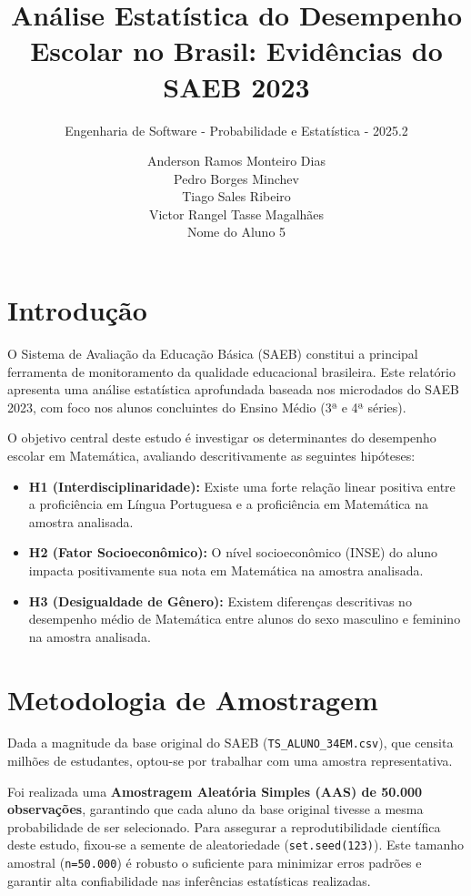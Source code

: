 \documentclass[
]{article}
\title{\textbf{Análise Estatística do Desempenho Escolar no Brasil:
Evidências do SAEB 2023}}
\subtitle{Engenharia de Software - Probabilidade e Estatística - 2025.2}
\author{Anderson Ramos Monteiro Dias\\
Pedro Borges Minchev\\
Tiago Sales Ribeiro\\
Victor Rangel Tasse Magalhães\\
Nome do Aluno 5}
\date{}
\begin{document}
\maketitle

\section{Introdução}\label{introduuxe7uxe3o}

O Sistema de Avaliação da Educação Básica (SAEB) constitui a principal
ferramenta de monitoramento da qualidade educacional brasileira. Este
relatório apresenta uma análise estatística aprofundada baseada nos
microdados do SAEB 2023, com foco nos alunos concluintes do Ensino Médio
(3ª e 4ª séries).

O objetivo central deste estudo é investigar os determinantes do
desempenho escolar em Matemática, avaliando descritivamente as seguintes
hipóteses:

\begin{itemize}
\item
  \textbf{H1 (Interdisciplinaridade):} Existe uma forte relação linear
  positiva entre a proficiência em Língua Portuguesa e a proficiência em
  Matemática na amostra analisada.
\item
  \textbf{H2 (Fator Socioeconômico):} O nível socioeconômico (INSE) do
  aluno impacta positivamente sua nota em Matemática na amostra
  analisada.
\item
  \textbf{H3 (Desigualdade de Gênero):} Existem diferenças descritivas
  no desempenho médio de Matemática entre alunos do sexo masculino e
  feminino na amostra analisada.
\end{itemize}

\section{Metodologia de Amostragem}\label{metodologia-de-amostragem}

Dada a magnitude da base original do SAEB
(\texttt{TS\_ALUNO\_34EM.csv}), que censita milhões de estudantes,
optou-se por trabalhar com uma amostra representativa.

Foi realizada uma \textbf{Amostragem Aleatória Simples (AAS) de 50.000
observações}, garantindo que cada aluno da base original tivesse a mesma
probabilidade de ser selecionado. Para assegurar a reprodutibilidade
científica deste estudo, fixou-se a semente de aleatoriedade
(\texttt{set.seed(123)}). Este tamanho amostral (\texttt{n=50.000}) é
robusto o suficiente para minimizar erros padrões e garantir alta
confiabilidade nas inferências estatísticas realizadas.
\end{document}
